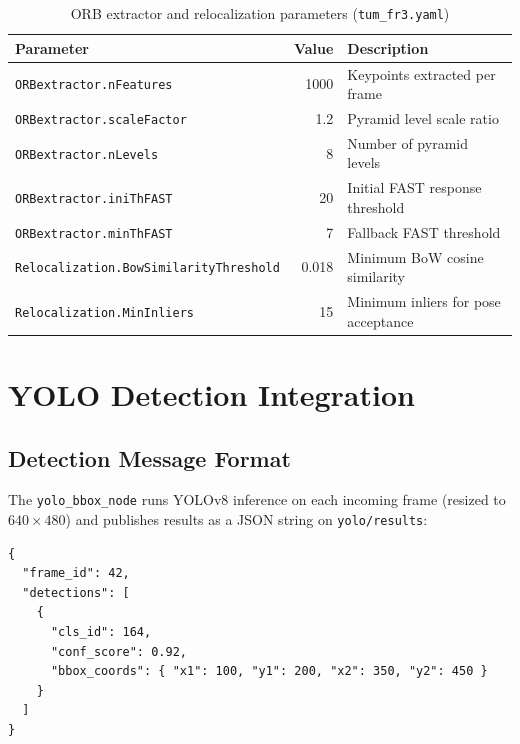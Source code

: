 \documentclass[12pt,a4paper]{article}
\begin{document}
\begin{table}[H]
\centering
\caption{ORB extractor and relocalization parameters (\texttt{tum\_fr3.yaml})}
\begin{tabular}{lrl}
\toprule
Parameter & Value & Description \\
\midrule
\texttt{ORBextractor.nFeatures}            & 1000  & Keypoints extracted per frame \\
\texttt{ORBextractor.scaleFactor}          & 1.2   & Pyramid level scale ratio \\
\texttt{ORBextractor.nLevels}              & 8     & Number of pyramid levels \\
\texttt{ORBextractor.iniThFAST}            & 20    & Initial FAST response threshold \\
\texttt{ORBextractor.minThFAST}            & 7     & Fallback FAST threshold \\
\texttt{Relocalization.BowSimilarityThreshold} & 0.018 & Minimum BoW cosine similarity \\
\texttt{Relocalization.MinInliers}         & 15    & Minimum inliers for pose acceptance \\
\bottomrule
\end{tabular}
\end{table}

\section{YOLO Detection Integration}

\subsection{Detection Message Format}

The \texttt{yolo\_bbox\_node} runs YOLOv8 inference on each incoming frame (resized to
$640\times480$) and publishes results as a JSON string on \texttt{yolo/results}:

\begin{lstlisting}[style=json,
  caption={JSON payload on \texttt{yolo/results} (\texttt{yolo\_bbox\_video.py})}]
{
  "frame_id": 42,
  "detections": [
    {
      "cls_id": 164,
      "conf_score": 0.92,
      "bbox_coords": { "x1": 100, "y1": 200, "x2": 350, "y2": 450 }
    }
  ]
}
\end{lstlisting}
\end{document}

